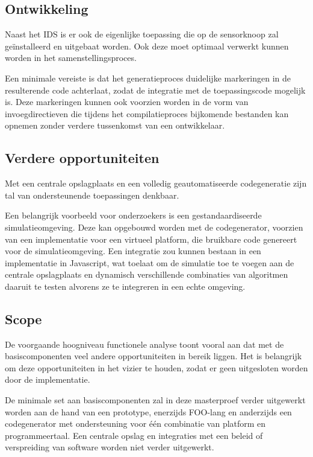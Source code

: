 \subsection{Ontwikkeling}
\label{subsection:arch-integration}

Naast het IDS is er ook de eigenlijke toepassing die op de sensorknoop zal
ge\"installeerd en uitgebaat worden. Ook deze moet optimaal verwerkt kunnen
worden in het samenstellingsproces.

Een minimale vereiste is dat het generatieproces duidelijke markeringen in de
resulterende code achterlaat, zodat de integratie met de toepassingscode
mogelijk is. Deze markeringen kunnen ook voorzien worden in de vorm van
invoegdirectieven die tijdens het compilatieproces bijkomende bestanden kan
opnemen zonder verdere tussenkomst van een ontwikkelaar.

\subsection{Verdere opportuniteiten}
\label{subsection:arch-opportunities}

Met een centrale opslagplaats en een volledig geautomatiseerde codegeneratie
zijn tal van ondersteunende toepassingen denkbaar.

Een belangrijk voorbeeld voor onderzoekers is een gestandaardiseerde
simulatieomgeving. Deze kan opgebouwd worden met de codegenerator, voorzien van
een implementatie voor een virtueel platform, die bruikbare code genereert voor
de simulatieomgeving. Een integratie zou kunnen bestaan in een implementatie in
Javascript, wat toelaat om de simulatie toe te voegen aan de centrale
opslagplaats en dynamisch verschillende combinaties van algoritmen daaruit te
testen alvorens ze te integreren in een echte omgeving.

\subsection{Scope}
\label{subsection:arch-scope}

De voorgaande hoogniveau functionele analyse toont vooral aan dat met de
basiscomponenten veel andere opportuniteiten in bereik liggen. Het is
belangrijk om deze opportuniteiten in het vizier te houden, zodat er geen
uitgesloten worden door de implementatie.

De minimale set aan basiscomponenten zal in deze masterproef verder uitgewerkt
worden aan de hand van een prototype, enerzijds FOO-lang en anderzijds een
codegenerator met ondersteuning voor \'e\'en combinatie van platform en
programmeertaal. Een centrale opslag en integraties met een beleid of
verspreiding van software worden niet verder uitgewerkt.

